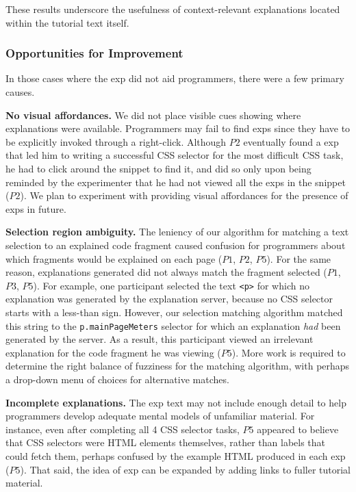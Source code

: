 These results underscore the usefulness of context-relevant explanations located within the tutorial text itself.

\subsubsection{Opportunities for Improvement}
In those cases where the \gls{exp} did not aid programmers, there were a few primary causes.

{\bf No visual affordances.} We did not place  visible cues showing where explanations were available.
Programmers may fail to find \glspl{exp} since they have to be explicitly invoked through a right-click.
Although $P2$ eventually found a \gls{exp} that led him to writing a successful CSS selector for the most difficult CSS task, he had to click around the snippet to find it, and did so only upon being reminded by the experimenter that he had not viewed all the \glspl{exp} in the snippet ($P2$).  We plan to experiment with providing visual affordances for the presence of \glspl{exp} in future.


{\bf Selection region ambiguity.}
The leniency of our algorithm for matching a text selection to an explained code fragment caused confusion for programmers about which fragments would be explained on each page ($P1$, $P2$, $P5$).
For the same reason, explanations generated did not always match the fragment selected ($P1$, $P3$, $P5$).
For example, one participant selected the text \texttt{<p>} for which no explanation was generated by the explanation server, because no CSS selector starts with a less-than sign.
However, our selection matching algorithm matched this string to the \texttt{p.mainPageMeters} selector for which an explanation \emph{had} been generated by the server.  As a result, this participant viewed an irrelevant explanation for the code fragment he was viewing ($P5$).  More work is required to determine the right balance of fuzziness for the matching algorithm, with perhaps a drop-down menu of choices for alternative matches.

{\bf Incomplete explanations.} The  \gls{exp} text may not include enough detail to help programmers  develop adequate mental models of unfamiliar material. For instance,
even after completing all 4 CSS selector tasks, $P5$ appeared to believe that CSS selectors were HTML elements themselves, rather than labels that could fetch them, perhaps confused by the example HTML produced in each \gls{exp} ($P5$).  That said, the idea of \gls{exp} can be expanded by adding links to fuller tutorial material.